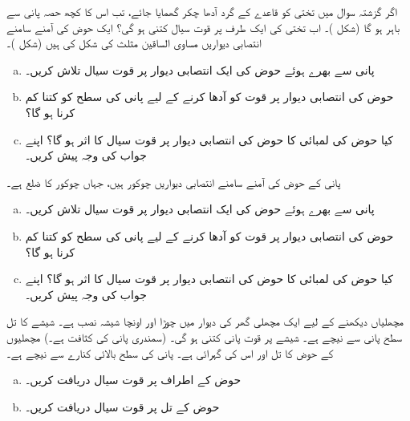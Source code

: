 اگر گزشتہ سوال میں تختی کو قاعدے  کے گرد آدھا چکر گھمایا جائے، تب اس کا کچھ حصہ پانی سے باہر ہو گا (شکل )۔ اب تختی کی ایک طرف پر  قوت سیال  کتنی ہو گی؟ 
ایک حوض کی    آمنے سامنے  انتصابی  دیواریں مساوی الساقین مثلث   کی شکل کی ہیں (شکل )۔
\begin{enumerate}[a.]
\item
 پانی سے بھرے ہوئے حوض کی  ایک    انتصابی دیوار  پر قوت سیال تلاش کریں۔
\item
حوض کی  انتصابی دیوار  پر قوت کو آدھا کرنے کے لیے پانی کی سطح کو کتنا کم کرنا ہو گا؟
\item
کیا حوض کی لمبائی کا حوض کی انتصابی دیوار  پر قوت سیال کا اثر ہو گا؟ اپنے جواب کی وجہ پیش کریں۔
\end{enumerate}
پانی کے حوض کی آمنے سامنے انتصابی دیواریں  چوکور ہیں، جہاں چوکور کا ضلع  ہے۔ 
\begin{enumerate}[a.]
\item
 پانی سے بھرے ہوئے حوض کی  ایک انتصابی دیوار  پر قوت سیال تلاش کریں۔
\item
حوض کی انتصابی دیوار  پر قوت کو آدھا کرنے کے لیے پانی کی سطح کو کتنا کم کرنا ہو گا؟
\item
کیا حوض کی لمبائی کا  حوض کی انتصابی دیوار  پر قوت سیال کا اثر ہو گا؟ اپنے جواب کی وجہ پیش کریں۔
\end{enumerate}
مچھلیاں دیکھنے کے لیے ایک مچھلی گھر کی دیوار میں  چوڑا اور  اونچا شیشہ نصب ہے۔ شیشے کا تل سطح پانی سے  نیچے ہے۔  شیشے پر قوت پانی کتنی ہو گی۔ (سمندری پانی کی کثافت  ہے۔)
مچھلیوں کے حوض کا تل  اور اس کی گہرائی  ہے۔ پانی کی سطح بالائی کنارے سے  نیچے ہے۔
\begin{enumerate}[a.]
\item
حوض کے اطراف پر قوت سیال دریافت کریں۔
\item
حوض کے تل پر قوت سیال دریافت کریں۔
\end{enumerate}
